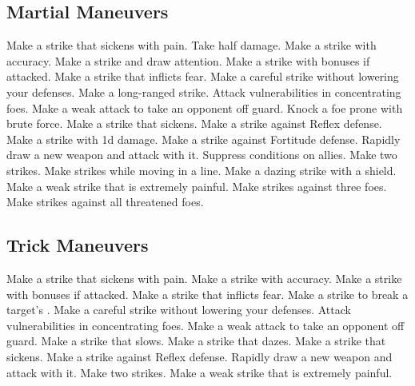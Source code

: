 \subsection{Martial Maneuvers}\label{Martial Maneuvers}
\begin{spelllist}
 Make a strike that sickens with pain.
 Take half damage.
 Make a strike with  accuracy.
 Make a strike and draw attention.
 Make a strike with bonuses if attacked.
 Make a strike that inflicts fear.
 Make a careful strike without lowering your defenses.
 Make a long-ranged strike.
 Attack vulnerabilities in concentrating foes.
 Make a weak attack to take an opponent off guard.
 Knock a foe prone with brute force.
 Make a strike that sickens.
 Make a strike against Reflex defense.
 Make a strike with \plus1d damage.
 Make a strike against Fortitude defense.
 Rapidly draw a new weapon and attack with it.
 Suppress conditions on allies.
 Make two strikes.
 Make strikes while moving in a line.
 Make a dazing strike with a shield.
 Make a weak strike that is extremely painful.
 Make strikes against three foes.
 Make strikes against all threatened foes.
\end{spelllist}



\small
\subsection{Trick Maneuvers}\label{Trick Maneuvers}
\begin{spelllist}
 Make a strike that sickens with pain.
 Make a strike with  accuracy.
 Make a strike with bonuses if attacked.
 Make a strike that inflicts fear.
 Make a strike to break a target's .
 Make a careful strike without lowering your defenses.
 Attack vulnerabilities in concentrating foes.
 Make a weak attack to take an opponent off guard.
 Make a strike that slows.
 Make a strike that dazes.
 Make a strike that sickens.
 Make a strike against Reflex defense.
 Rapidly draw a new weapon and attack with it.
 Make two strikes.
 Make a weak strike that is extremely painful.
\end{spelllist}




